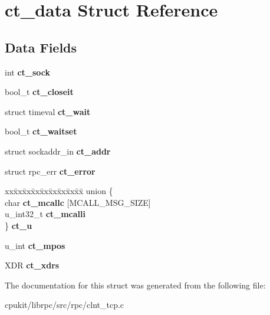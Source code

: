 \hypertarget{structct__data}{}\section{ct\+\_\+data Struct Reference}
\label{structct__data}
\subsection*{Data Fields}
\begin{DoxyCompactItemize}
\item 
\mbox{\label{structct__data_a0e1b35206318be0bed347995e95de272}} 
int {\bfseries ct\+\_\+sock}
\item 
\mbox{\label{structct__data_a451406743e036900c586d09718d87c67}} 
bool\+\_\+t {\bfseries ct\+\_\+closeit}
\item 
\mbox{\label{structct__data_aa02f8544e1acc0f9c88926ad4c6ac95e}} 
struct timeval {\bfseries ct\+\_\+wait}
\item 
\mbox{\label{structct__data_a3ef61c766627722b8a32efe335090541}} 
bool\+\_\+t {\bfseries ct\+\_\+waitset}
\item 
\mbox{\label{structct__data_a2ea2a94a26e99779819754ec7707ed3e}} 
struct sockaddr\+\_\+in {\bfseries ct\+\_\+addr}
\item 
\mbox{\label{structct__data_a81aac1311eefcd806c50f53e3ffcd115}} 
struct rpc\+\_\+err {\bfseries ct\+\_\+error}
\item 
\mbox{\label{structct__data_aa9bd984b96be201b0ef284b8b6297e18}} 
\begin{tabbing}
xx\=xx\=xx\=xx\=xx\=xx\=xx\=xx\=xx\=\kill
union \{\\
\>char {\bfseries ct\_mcallc} \mbox{[}MCALL\_MSG\_SIZE\mbox{]}\\
\>u\_int32\_t {\bfseries ct\_mcalli}\\
\} {\bfseries ct\_u}\\

\end{tabbing}\item 
\mbox{\label{structct__data_adc7042083aa5aedd67de0dbd2ca33c10}} 
u\+\_\+int {\bfseries ct\+\_\+mpos}
\item 
\mbox{\label{structct__data_aeb8883036c30663aa6363c26ce77ff35}} 
X\+DR {\bfseries ct\+\_\+xdrs}
\end{DoxyCompactItemize}


The documentation for this struct was generated from the following file\+:\begin{DoxyCompactItemize}
\item 
cpukit/librpc/src/rpc/clnt\+\_\+tcp.\+c\end{DoxyCompactItemize}
